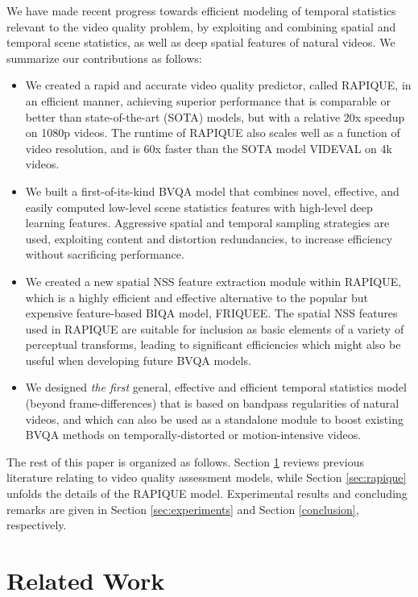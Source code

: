\documentclass[transmag]{IEEEtran}
\begin{document}
We have made recent progress towards efficient modeling of temporal statistics relevant to the video quality problem, by exploiting and combining spatial and temporal scene statistics, as well as deep spatial features of natural videos. We summarize our contributions as follows:

\begin{itemize}
    \item We created a rapid and accurate video quality predictor, called RAPIQUE, in an efficient manner, achieving superior performance that is comparable or better than state-of-the-art (SOTA) models, but with a relative 20x speedup on 1080p videos. The runtime of RAPIQUE also scales well as a function of video resolution, and is 60x faster than the SOTA model VIDEVAL on 4k videos.
    \item We built a first-of-its-kind BVQA model that combines novel, effective, and easily computed low-level scene statistics features with high-level deep learning features. Aggressive spatial and temporal sampling strategies are used, exploiting content and distortion redundancies, to increase efficiency without sacrificing performance.
    \item We created a new spatial NSS feature extraction module within RAPIQUE, which is a highly efficient and effective alternative to the popular but expensive feature-based BIQA model, FRIQUEE. The spatial NSS features used in RAPIQUE are suitable for inclusion as basic elements of a variety of perceptual transforms, leading to significant efficiencies which might also be useful when developing future BVQA models.
    \item We designed \textit{the first} general, effective and efficient temporal statistics model (beyond frame-differences) that is based on bandpass regularities of natural videos, and which can also be used as a standalone module to boost existing BVQA methods on temporally-distorted or motion-intensive videos.
\end{itemize}

The rest of this paper is organized as follows. Section \ref{sec:related_work} reviews previous literature relating to video quality assessment models, while Section \ref{sec:rapique} unfolds the details of the RAPIQUE model. Experimental results and concluding remarks are given in Section \ref{sec:experiments} and Section \ref{conclusion}, respectively.

\section{Related Work}
\label{sec:related_work}
\end{document}
